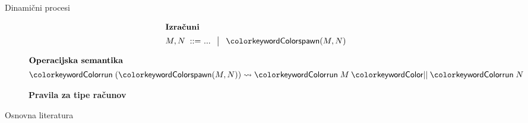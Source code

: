 \documentclass{beamer}
\theoremstyle{definition} %
\theoremstyle{plain} %
\begin{document}
	\begin{frame}{Dinamični procesi}
		\begin{figure}[hp]
			\parbox{\textwidth}{
				\centering
				\tiny
				\begin{align*}
				\shortintertext{\textbf{Izračuni}}
				M, N
				\bnfis & ... \,\bnfor\! \tmspawn{M}{N}
				\end{align*}
			} 
		\end{figure}
		
		\begin{figure}[tp]
			\centering
			\tiny
			\begin{align*}
			\shortintertext{\textbf{Operacijska semantika}}
			\tmrun{(\tmspawn{M}{N})} & \reduces \tmpar{\tmrun{M}}{\tmrun{N}}
			\end{align*}
		\end{figure}
	
		\begin{figure}[tp]
			\centering
			\tiny
			\textbf{Pravila za tipe računov}
			\begin{mathpar}
			\end{mathpar}
		\end{figure}
	\end{frame}
	
	
	
	
	\begin{frame}{Osnovna literatura}
				
		
		
	\end{frame}
	
	
\end{document}
